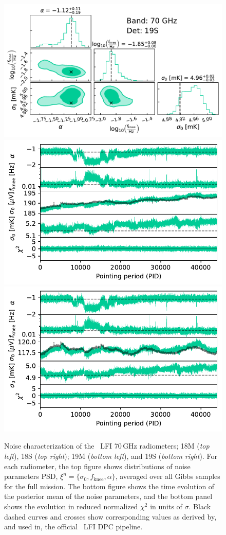 \documentclass[twocolumn]{aa}
\begin{document}
\begin{figure}[p]
\begin{center}
		\includegraphics[width=0.495\linewidth]{figs/corner_band_070_det_4_mean.pdf}\\
		\includegraphics[width=0.495\linewidth]{figs/xi_vs_pid_band_070_det_3_mean.pdf}
		\includegraphics[width=0.495\linewidth]{figs/xi_vs_pid_band_070_det_4_mean.pdf}
		 \vspace*{-4.9mm}            
	\end{center}
	
	\caption{Noise characterization of the \Planck\ LFI 70\,GHz
		radiometers; 18M (\emph{top left}), 18S (\emph{top right}); 19M
		(\emph{bottom left}), and 19S (\emph{bottom right}). For each
		radiometer, the top figure shows distributions of noise parameters
		PSD, $\xi^n = \{\sigma_0, f_\mathrm{knee}, \alpha\}$, averaged
		over all Gibbs samples for the full mission. The bottom figure
		shows the time evolution of the posterior mean of the noise
		parameters, and the bottom panel shows the evolution in reduced
		normalized $\chi^2$ in units of $\sigma$. Black dashed curves and crosses show corresponding values as derived by, and used in, the
		official \Planck\ LFI DPC pipeline.
		\label{fig:xi_prop_70_1}}
\end{figure}
\end{document}
